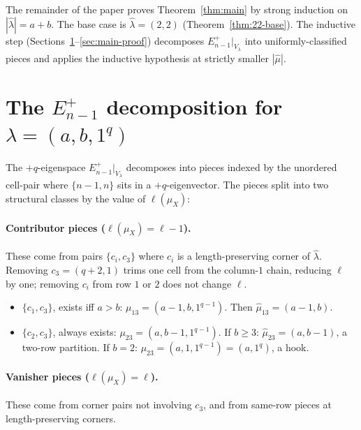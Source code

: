 \documentclass[11pt]{article}
\theoremstyle{definition}
\newcommand{\Vlam}{V_\lambda}
\newcommand{\hatl}{\widehat\lambda}
\newcommand{\hatm}{\widehat\mu}
\begin{document}
The remainder of the paper proves Theorem~\ref{thm:main} by strong
induction on $|\hatl| = a + b$.  The base case is $\hatl = (2, 2)$
(Theorem~\ref{thm:22-base}).  The inductive step
(Sections~\ref{sec:Eplus}--\ref{sec:main-proof}) decomposes $E_{n-1}^+|_{\Vlam}$
into uniformly-classified pieces and applies the inductive hypothesis
at strictly smaller $|\hatm|$.

\section{The $E^+_{n-1}$ decomposition for $\lambda = (a, b, 1^q)$}\label{sec:Eplus}

The $+q$-eigenspace $E_{n-1}^+|_{\Vlam}$ decomposes into pieces indexed
by the unordered cell-pair where $\{n-1, n\}$ sits in a $+q$-eigenvector.
The pieces split into two structural classes by the value of
$\ell(\mu_X)$:

\paragraph{Contributor pieces ($\ell(\mu_X) = \ell - 1$).}
These come from pairs $\{c_i, c_3\}$ where $c_i$ is a length-preserving
corner of $\hatl$.  Removing $c_3 = (q+2, 1)$ trims one cell from the
column-$1$ chain, reducing $\ell$ by one; removing $c_i$ from row $1$
or $2$ does not change $\ell$.
\begin{itemize}[topsep=0.2em,itemsep=0.1em]
\item $\{c_1, c_3\}$, exists iff $a > b$: $\mu_{13} = (a-1, b, 1^{q-1})$.
   Then $\hatm_{13} = (a-1, b)$.
\item $\{c_2, c_3\}$, always exists: $\mu_{23} = (a, b-1, 1^{q-1})$.
   If $b \ge 3$: $\hatm_{23} = (a, b-1)$, a two-row partition.
   If $b = 2$: $\mu_{23} = (a, 1, 1^{q-1}) = (a, 1^q)$, a hook.
\end{itemize}

\paragraph{Vanisher pieces ($\ell(\mu_X) = \ell$).}
These come from corner pairs not involving $c_3$, and from same-row
pieces at length-preserving corners.
\end{document}

